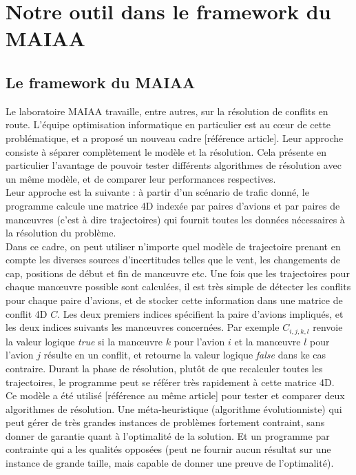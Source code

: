 \chapter{Notre outil dans le framework du MAIAA}

\section{Le framework du MAIAA}

Le laboratoire MAIAA travaille, entre autres, sur la résolution de conflits en route. L'équipe optimisation informatique en particulier est au cœur de cette problématique, et a proposé un nouveau cadre [référence article]. Leur approche consiste à séparer complètement le modèle et la résolution. Cela présente en particulier l'avantage de pouvoir tester différents algorithmes de résolution avec un même modèle, et de comparer leur performances respectives.  \\

Leur approche est la suivante : à partir d'un scénario de trafic donné, le programme calcule une matrice 4D indexée par paires d'avions et par paires de manœuvres (c'est à dire trajectoires) qui fournit toutes les données nécessaires à la résolution du problème. \\

Dans ce cadre, on peut utiliser n'importe quel modèle de trajectoire prenant en compte les diverses sources d'incertitudes telles que le vent, les changements de cap, positions de début et fin de manœuvre etc. Une fois que les trajectoires pour chaque manœuvre possible sont calculées, il est très simple de détecter les conflits pour chaque paire d'avions, et de stocker cette information dans une matrice de conflit 4D $C$. Les deux premiers indices spécifient la paire d'avions impliqués, et les deux indices suivants les manœuvres concernées. Par exemple $C_{i,j,k,l}$ renvoie la valeur logique \textit{true} si la manœuvre $k$ pour l'avion $i$ et la manœuvre $l$ pour l'avion $j$ résulte en un conflit, et retourne la valeur logique \textit{false} dans ke cas contraire. Durant la phase de résolution, plutôt de que recalculer toutes les trajectoires, le programme peut se référer très rapidement à cette matrice 4D. \\

Ce modèle a été utilisé [référence au même article] pour tester et comparer deux algorithmes de résolution. Une méta-heuristique (algorithme évolutionniste) qui peut gérer de très grandes instances de problèmes fortement contraint, sans donner de garantie quant à l'optimalité de la solution. Et un programme par contrainte qui a les qualités opposées (peut ne fournir aucun résultat sur une instance de grande taille, mais capable de donner une preuve de l'optimalité).

